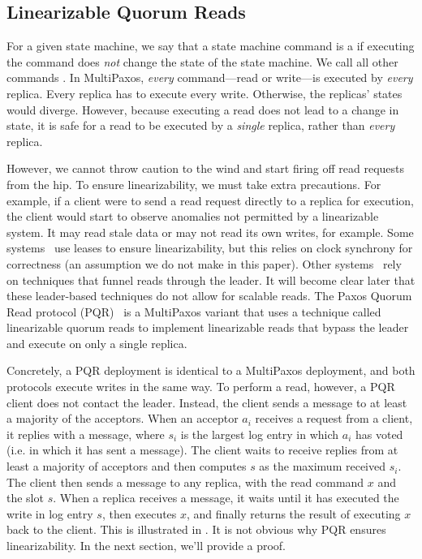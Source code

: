 {}

\subsection{Linearizable Quorum Reads}
For a given state machine, we say that a state machine command is a
 if executing the command does \emph{not} change the state of the
state machine. We call all other commands . In MultiPaxos,
\emph{every} command---read or write---is executed by \emph{every} replica.
Every replica has to execute every write.  Otherwise, the replicas' states
would diverge. However, because executing a read does not lead to a change in
state, it is safe for a read to be executed by a \emph{single} replica, rather
than \emph{every} replica.

However, we cannot throw caution to the wind and start firing off read requests
from the hip. To ensure linearizability, we must take extra precautions. For
example, if a client were to send a read request directly to a replica for
execution, the client would start to observe anomalies not permitted by a
linearizable system. It may read stale data or may not read its own writes, for
example.
%
Some systems~\cite{burrows2006chubby} use leases to ensure linearizability, but
this relies on clock synchrony for correctness (an assumption we do not make in
this paper). Other systems~\cite{bolosky2011paxos,ongaro2013search} rely on
techniques that funnel reads through the leader. It will become clear later
that these leader-based techniques do not allow for scalable reads.
%
The Paxos Quorum Read protocol (PQR)~\cite{charapko2019linearizable} is a
MultiPaxos variant that uses a technique called linearizable quorum reads to
implement linearizable reads that bypass the leader and execute on only a
single replica.
%

Concretely, a PQR deployment is identical to a MultiPaxos deployment, and both
protocols execute writes in the same way. To perform a read, however, a PQR
client does not contact the leader. Instead, the client sends a
 message to at least a majority of the acceptors. When an
acceptor $a_i$ receives a  request from a client, it replies
with a  message, where $s_i$ is the largest log entry in
which $a_i$ has voted (i.e. in which it has sent a  message).
The client waits to receive  replies from at least a
majority of acceptors and then computes $s$ as the maximum received $s_i$. The
client then sends a  message to any replica, with the read
command $x$ and the slot $s$. When a replica receives a 
message, it waits until it has executed the write in log entry $s$, then
executes $x$, and finally returns the result of executing $x$ back to the
client. This is illustrated in . It is not obvious
why PQR ensures linearizability. In the next section, we'll provide a proof.

{}
